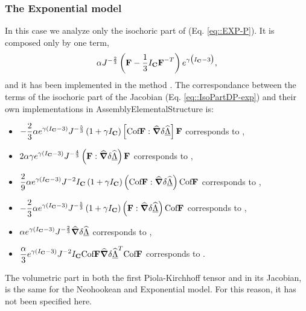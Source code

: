 \subsubsection{The Exponential model} In this case we analyze only the
isochoric part of \Piola{} (Eq. \eqref{eq::EXP-P}). It is composed only
by one term,
\begin{displaymath}
  \displaystyle \alpha
  J^{-\frac{2}{3}}\left(\textbf{F}-\frac{1}{3}I_{\textbf{C}}\textbf{F}^{-T}\right)
  e^{\gamma\big(I_{\textbf{C}}-3\big)},
\end{displaymath}
and it has been implemented in the method
.  The correspondance between the terms of the
isochoric part of the Jacobian (Eq. \eqref{eq::IsoPartDP-exp}) and
their own implementations in AssemblyElementalStructure is:
\begin{itemize}
\item $\displaystyle -\frac{2}{3}\alpha e^{\gamma\left(I_{\textbf{C}}-3\right)}
  J^{-\frac{5}{3}}\left(1+\gamma
    I_{\textbf{C}}\right)\left[\text{Cof}\textbf{F}:\widehat{\boldsymbol{\nabla}}\delta\widehat{\underline{\Lambda}}\right]\textbf{F}$ corresponds to
  ,
\item $\displaystyle 2\alpha\gamma e^{\gamma\left(I_{\textbf{C}}-3\right)} J
  ^{-\frac{4}{3}}\left(\textbf{F}:\widehat{\boldsymbol{\nabla}}\delta\widehat{\underline{\Lambda}}\right)\textbf{F}$ corresponds to
  ,
\item $\displaystyle \frac{2}{9}\alpha e^{\gamma\left(I_{\textbf{C}}-3\right)}
  J^{-2}I_{\textbf{C}}\left(1+\gamma
    I_{\textbf{C}}\right)\left(\text{Cof}\textbf{F}:\widehat{\boldsymbol{\nabla}}\delta\widehat{\underline{\Lambda}}\right)\text{Cof}\textbf{F}$ corresponds to
  ,
\item $\displaystyle -\frac{2}{3}\alpha e^{\gamma\left(I_{\textbf{C}}-3\right)}
  J^{-\frac{5}{3}}\left(1+\gamma
    I_{\textbf{C}}\right)\left(\textbf{F}:\widehat{\boldsymbol{\nabla}}\delta\widehat{\underline{\Lambda}}\right)\text{Cof}\textbf{F}$ corresponds to
  ,
\item $\displaystyle \alpha e^{\gamma\left(I_{\textbf{C}}-3\right)} J^{-\frac{2}{3}}\widehat{\boldsymbol{\nabla}}\delta\widehat{\underline{\Lambda}}$
  corresponds to ,
\item $\displaystyle \frac{\alpha}{3}e^{\gamma\left(I_{\textbf{C}}-3\right)}
  J^{-2}I_{\textbf{C}}\text{Cof}\textbf{F}\widehat{\boldsymbol{\nabla}}\delta\widehat{\underline{\Lambda}}^T\text{Cof}\textbf{F}$ corresponds to
  .
\end{itemize}
The volumetric part in both the first Piola-Kirchhoff
tensor and in its Jacobian, is the same for the Neohookean and
Exponential model. For this reason, it has not been specified here.
